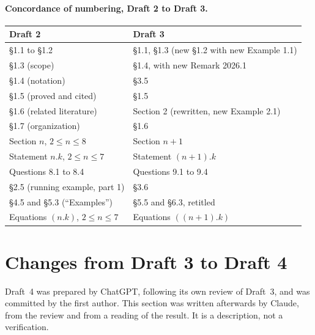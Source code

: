 \documentclass[12pt,letterpaper]{article}
\begin{document}
\paragraph{Concordance of numbering, Draft 2 to Draft 3.}
\begin{center}
\begin{tabular}{@{}ll@{}}
\toprule
Draft 2 & Draft 3 \\
\midrule
\S1.1 to \S1.2 & \S1.1, \S1.3 (new \S1.2 with new Example 1.1) \\
\S1.3 (scope) & \S1.4, with new Remark 2026.1 \\
\S1.4 (notation) & \S3.5 \\
\S1.5 (proved and cited) & \S1.5 \\
\S1.6 (related literature) & Section 2 (rewritten, new Example 2.1) \\
\S1.7 (organization) & \S1.6 \\
Section $n$, $2\le n\le 8$ & Section $n+1$ \\
Statement $n.k$, $2\le n\le 7$ & Statement $(n+1).k$ \\
Questions 8.1 to 8.4 & Questions 9.1 to 9.4 \\
\S2.5 (running example, part 1) & \S3.6 \\
\S4.5 and \S5.3 (``Examples'') & \S5.5 and \S6.3, retitled \\
Equations $(n.k)$, $2\le n\le 7$ & Equations $((n+1).k)$ \\
\bottomrule
\end{tabular}
\end{center}

\section{Changes from Draft 3 to Draft 4}\label{sec:d3d4}

Draft~4 was prepared by ChatGPT, following its own review of Draft~3,
and was committed by the first author. This section was written
afterwards by Claude, from the review and from a reading of the result.
It is a description, not a verification.
\end{document}
